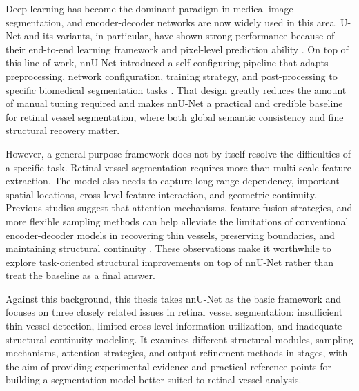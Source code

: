 \documentclass[a4paper,11pt]{article}
\begin{document}
Deep learning has become the dominant paradigm in medical image segmentation, and encoder-decoder networks are now widely used in this area. U-Net and its variants, in particular, have shown strong performance because of their end-to-end learning framework and pixel-level prediction ability \cite{ronneberger2015unet,cicek2016unet3d,milletari2016vnet}. On top of this line of work, nnU-Net introduced a self-configuring pipeline that adapts preprocessing, network configuration, training strategy, and post-processing to specific biomedical segmentation tasks \cite{isensee2021nnunet}. That design greatly reduces the amount of manual tuning required and makes nnU-Net a practical and credible baseline for retinal vessel segmentation, where both global semantic consistency and fine structural recovery matter.

However, a general-purpose framework does not by itself resolve the difficulties of a specific task. Retinal vessel segmentation requires more than multi-scale feature extraction. The model also needs to capture long-range dependency, important spatial locations, cross-level feature interaction, and geometric continuity. Previous studies suggest that attention mechanisms, feature fusion strategies, and more flexible sampling methods can help alleviate the limitations of conventional encoder-decoder models in recovering thin vessels, preserving boundaries, and maintaining structural continuity \cite{luo2025panet,oktay2018attentionunet,zhu2021deformabledetr}. These observations make it worthwhile to explore task-oriented structural improvements on top of nnU-Net rather than treat the baseline as a final answer.

Against this background, this thesis takes nnU-Net as the basic framework and focuses on three closely related issues in retinal vessel segmentation: insufficient thin-vessel detection, limited cross-level information utilization, and inadequate structural continuity modeling. It examines different structural modules, sampling mechanisms, attention strategies, and output refinement methods in stages, with the aim of providing experimental evidence and practical reference points for building a segmentation model better suited to retinal vessel analysis.
\end{document}
